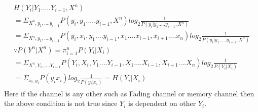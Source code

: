 \documentclass[a4paper]{article}
\begin{document}
\begin{enumerate}
\begin{align}
\begin{split}
                H(Y_i \vert Y_1.....Y_{i-1},X^n) \\
                   = \Sigma_{X^n, y_1,....y_{i-1}} P(y_i, y_1.....y_{i-1},X^n) log_2\frac{1}{P(y_i \vert y_1.....y_{i-1},X^n)} \\
        = \Sigma_{X^n, y_1,....y_{i-1}} P(y_i,x_i, y_1....y_{i-1},x_1....x_{i-1},x_{i+1}....x_n) log_2\frac{1}{P(y_i \vert y_1.....y_{i-1},X^n)}\\
        \because P{(Y^n\vert X^n)} = \pi_{i=1}^n P{(Y_i\vert X_i)}\\
        =\Sigma_{X^n, Y_1,....Y_{i-1}} P(Y_i,X_i, Y_1....Y_{i-1},X_1....X_{i-1},X_{i+1}....X_n) log_2\frac{1}{P(Y_i \vert X_i)}\\
        = \Sigma_{x_i,y_i} P(y_i x_i) log_2 \frac{1}{P(y_i \vert x_i)}
        = H(Y_i \vert X_i)
        \end{split}
    \end{align}
    Here if the channel is any other such as Fading channel or memory channel then the above condition is not true since $Y_i$ is dependent on other $Y_i$.
    

\end{enumerate}
\end{document}
